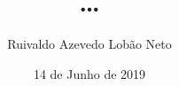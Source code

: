\documentclass[msc, classic, a4paper]{ufbathesis}
\institute{Instituto de Matem\'{a}tica}
\title{\dots}
\date{14 de Junho de 2019}
\author{Ruivaldo Azevedo Lobão Neto}
\begin{document}
\pgcompfrontpage

\frontmatter

\pgcomppresentationpage










\resumo
\end{document}
